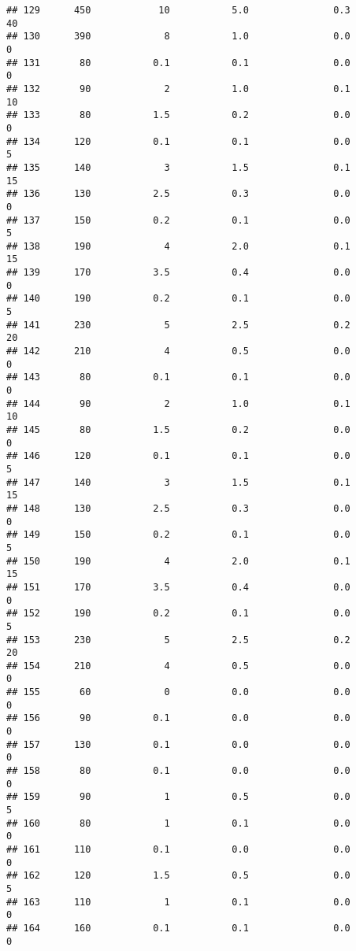 \documentclass[
]{article}
\begin{document}
\begin{verbatim}
## 129      450            10           5.0               0.3          40
## 130      390             8           1.0               0.0           0
## 131       80           0.1           0.1               0.0           0
## 132       90             2           1.0               0.1          10
## 133       80           1.5           0.2               0.0           0
## 134      120           0.1           0.1               0.0           5
## 135      140             3           1.5               0.1          15
## 136      130           2.5           0.3               0.0           0
## 137      150           0.2           0.1               0.0           5
## 138      190             4           2.0               0.1          15
## 139      170           3.5           0.4               0.0           0
## 140      190           0.2           0.1               0.0           5
## 141      230             5           2.5               0.2          20
## 142      210             4           0.5               0.0           0
## 143       80           0.1           0.1               0.0           0
## 144       90             2           1.0               0.1          10
## 145       80           1.5           0.2               0.0           0
## 146      120           0.1           0.1               0.0           5
## 147      140             3           1.5               0.1          15
## 148      130           2.5           0.3               0.0           0
## 149      150           0.2           0.1               0.0           5
## 150      190             4           2.0               0.1          15
## 151      170           3.5           0.4               0.0           0
## 152      190           0.2           0.1               0.0           5
## 153      230             5           2.5               0.2          20
## 154      210             4           0.5               0.0           0
## 155       60             0           0.0               0.0           0
## 156       90           0.1           0.0               0.0           0
## 157      130           0.1           0.0               0.0           0
## 158       80           0.1           0.0               0.0           0
## 159       90             1           0.5               0.0           5
## 160       80             1           0.1               0.0           0
## 161      110           0.1           0.0               0.0           0
## 162      120           1.5           0.5               0.0           5
## 163      110             1           0.1               0.0           0
## 164      160           0.1           0.1               0.0           0

\end{verbatim}
\end{document}

